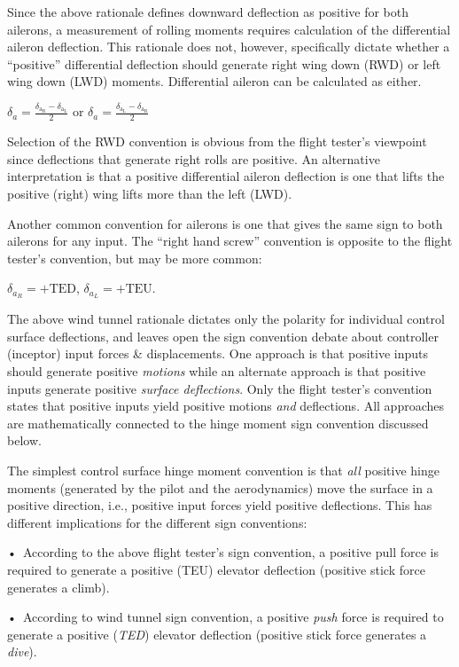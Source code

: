 \documentclass[
]{book}
\begin{document}
Since the above rationale defines downward deflection as positive for both ailerons, a measurement of rolling moments requires calculation of the differential aileron deflection. This rationale does not, however, specifically dictate whether a ``positive'' differential deflection should generate right wing down (RWD) or left wing down (LWD) moments. Differential aileron can be calculated as either.

\(\delta_{a} = \frac{\delta_{\mathrm{a_R}} - \delta_{\mathrm{a_L}}}{2}\) or \(\delta_{a} = \frac{\delta_{\mathrm{a_L}} - \delta_{\mathrm{a_R}}}{2}\)

Selection of the RWD convention is obvious from the flight tester's viewpoint since deflections that generate right rolls are positive. An alternative interpretation is that a positive differential aileron deflection is one that lifts the positive (right) wing lifts more than the left (LWD).

Another common convention for ailerons is one that gives the same sign to both ailerons for any input. The ``right hand screw'' convention is opposite to the flight tester's convention, but may be more common:

\(\delta_{a_R} = +\mathrm{TED}\), \(\delta_{a_L} = +\mathrm{TEU}\).

The above wind tunnel rationale dictates only the polarity for individual control surface deflections, and leaves open the sign convention debate about controller (inceptor) input forces \& displacements. One approach is that positive inputs should generate positive \emph{motions} while an alternate approach is that positive inputs generate positive \emph{surface deflections}. Only the flight tester's convention states that positive inputs yield positive motions \emph{and} deflections. All approaches are mathematically connected to the hinge moment sign convention discussed below.

The simplest control surface hinge moment convention is that \emph{all} positive hinge moments (generated by the pilot and the aerodynamics) move the surface in a positive direction, i.e., positive input forces yield positive deflections. This has different implications for the different sign conventions:

•~According to the above flight tester's sign convention, a positive pull force is required to generate a positive (TEU) elevator deflection (positive stick force generates a climb).

•~According to wind tunnel sign convention, a positive \emph{push} force is required to generate a positive (\emph{TED}) elevator deflection (positive stick force generates a \emph{dive}).
\end{document}
